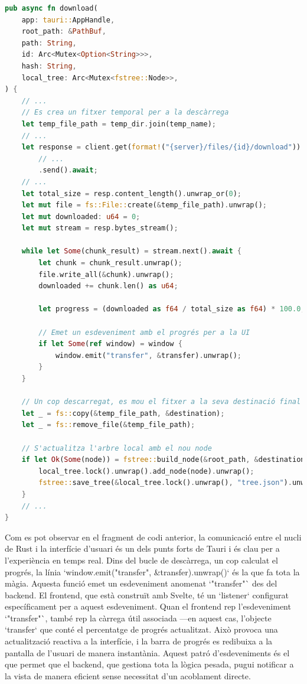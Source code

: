 \begin{lstlisting}[language=rust, caption={Gestió de la descàrrega amb progrés a \texttt{api.rs}}]
pub async fn download(
    app: tauri::AppHandle,
    root_path: &PathBuf,
    path: String,
    id: Arc<Mutex<Option<String>>>,
    hash: String,
    local_tree: Arc<Mutex<fstree::Node>>,
) {
    // ...
    // Es crea un fitxer temporal per a la descàrrega
    let temp_file_path = temp_dir.join(temp_name);
    // ...
    let response = client.get(format!("{server}/files/{id}/download"))
        // ...
        .send().await;
    // ...
    let total_size = resp.content_length().unwrap_or(0);
    let mut file = fs::File::create(&temp_file_path).unwrap();
    let mut downloaded: u64 = 0;
    let mut stream = resp.bytes_stream();

    while let Some(chunk_result) = stream.next().await {
        let chunk = chunk_result.unwrap();
        file.write_all(&chunk).unwrap();
        downloaded += chunk.len() as u64;

        let progress = (downloaded as f64 / total_size as f64) * 100.0;
        
        // Emet un esdeveniment amb el progrés per a la UI
        if let Some(ref window) = window {
            window.emit("transfer", &transfer).unwrap();
        }
    }
    
    // Un cop descarregat, es mou el fitxer a la seva destinació final
    let _ = fs::copy(&temp_file_path, &destination);
    let _ = fs::remove_file(&temp_file_path);

    // S'actualitza l'arbre local amb el nou node
    if let Ok(Some(node)) = fstree::build_node(&root_path, &destination).map(Some) {
        local_tree.lock().unwrap().add_node(node).unwrap();
        fstree::save_tree(&local_tree.lock().unwrap(), "tree.json").unwrap();
    }
    // ...
}
\end{lstlisting}

Com es pot observar en el fragment de codi anterior, la comunicació entre el nucli de Rust i la interfície d'usuari és un dels punts forts de Tauri i és clau per a l'experiència en temps real. Dins del bucle de descàrrega, un cop calculat el progrés, la línia `window.emit("transfer", &transfer).unwrap()` és la que fa tota la màgia. Aquesta funció emet un esdeveniment anomenat `"transfer"` des del backend. El frontend, que està construït amb Svelte, té un `listener` configurat específicament per a aquest esdeveniment. Quan el frontend rep l'esdeveniment `"transfer"`, també rep la càrrega útil associada —en aquest cas, l'objecte `transfer` que conté el percentatge de progrés actualitzat. Això provoca una actualització reactiva a la interfície, i la barra de progrés es redibuixa a la pantalla de l'usuari de manera instantània. Aquest patró d'esdeveniments és el que permet que el backend, que gestiona tota la lògica pesada, pugui notificar a la vista de manera eficient sense necessitat d'un acoblament directe.

